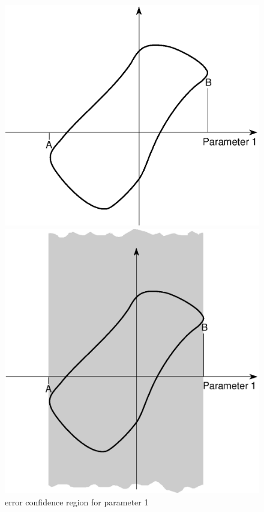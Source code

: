 \begin{figure}[ht]
\begin{minipage}{.49\linewidth}
\includegraphics[width=\linewidth]{minoserr.eps}
\caption[MINOS errors for parameter 1]%
        { errors for parameter 1}
\label{fig:MINoserror}
\end{minipage}\hfill
\begin{minipage}{.49\linewidth}
\includegraphics[width=\linewidth]{minosco1.eps}
\caption[MINOS error confidence region for parameter 1]%
        { error confidence region for parameter 1}
\label{fig:MINosconf1}
\end{minipage}
\end{figure}

